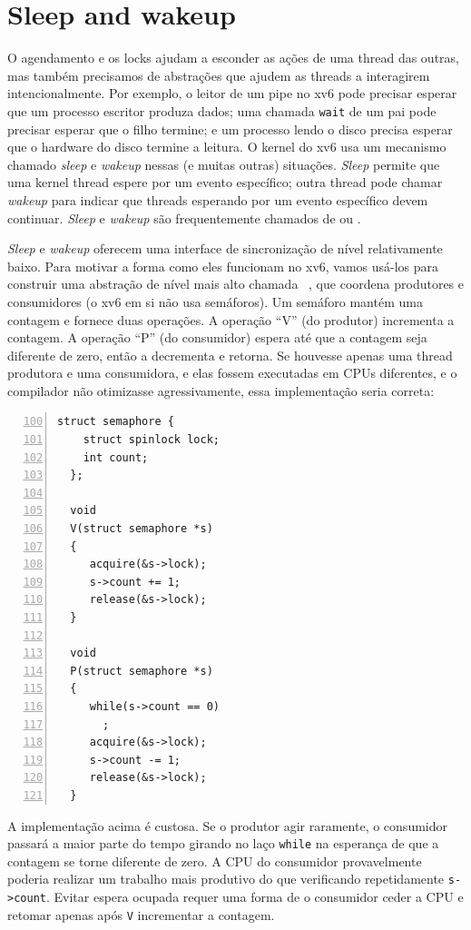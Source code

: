 \section{Sleep and wakeup}
\label{sec:sleep}

O agendamento e os locks ajudam a esconder as ações de uma thread das outras,
mas também precisamos de abstrações que ajudem as threads a interagirem intencionalmente.
Por exemplo, o leitor de um pipe no xv6 pode precisar esperar que um processo escritor produza dados;
uma chamada \lstinline{wait} de um pai pode precisar esperar que o filho termine;
e um processo lendo o disco precisa esperar que o hardware do disco termine a leitura.
O kernel do xv6 usa um mecanismo chamado \textit{sleep} e \textit{wakeup} nessas (e muitas outras) situações.
\textit{Sleep} permite que uma kernel thread espere por um evento específico;
outra thread pode chamar \textit{wakeup} para indicar que threads esperando por um evento específico devem continuar.
\textit{Sleep} e \textit{wakeup} são frequentemente chamados de
ou
.

\textit{Sleep} e \textit{wakeup} oferecem uma interface de sincronização de nível relativamente baixo.
Para motivar a forma como eles funcionam no xv6, vamos usá-los para construir uma abstração de nível mais alto chamada
~\cite{dijkstra65},
que coordena produtores e consumidores
(o xv6 em si não usa semáforos).
Um semáforo mantém uma contagem e fornece duas operações.
A operação “V” (do produtor) incrementa a contagem.
A operação “P” (do consumidor) espera até que a contagem seja diferente de zero,
então a decrementa e retorna.
Se houvesse apenas uma thread produtora e uma consumidora,
e elas fossem executadas em CPUs diferentes,
e o compilador não otimizasse agressivamente,
essa implementação seria correta:
\begin{lstlisting}[numbers=left,firstnumber=100]
  struct semaphore {
    struct spinlock lock;
    int count;
  };

  void
  V(struct semaphore *s)
  {
     acquire(&s->lock);
     s->count += 1;
     release(&s->lock);
  }

  void
  P(struct semaphore *s)
  {
     while(s->count == 0)
       ;
     acquire(&s->lock);
     s->count -= 1;
     release(&s->lock);
  }
\end{lstlisting}
A implementação acima é custosa.
Se o produtor agir raramente, o consumidor passará a maior parte do tempo girando no laço
\lstinline{while}
na esperança de que a contagem se torne diferente de zero.
A CPU do consumidor provavelmente poderia realizar um trabalho mais produtivo do que
verificando repetidamente
\lstinline{s->count}.
Evitar espera ocupada requer uma forma de o consumidor ceder a CPU
e retomar apenas após
\lstinline{V}
incrementar a contagem.

